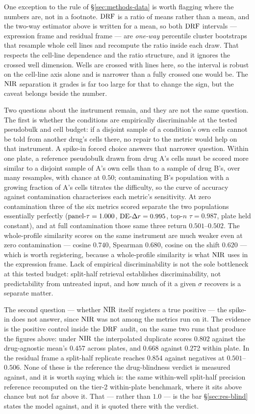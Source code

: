 One exception to the rule of \S\ref{sec:methods-data} is worth flagging where the numbers are, not
in a footnote. $\textrm{DRF}$ is a ratio of means rather than a mean, and the two-way estimator above is
written for a mean, so both $\textrm{DRF}$ intervals --- expression frame and residual frame --- are
\emph{one-way} percentile cluster bootstraps that resample whole cell lines and recompute the ratio
inside each draw. That respects the cell-line dependence and the ratio structure, and it ignores the
crossed well dimension. Wells are crossed with lines here, so the interval is robust on the
cell-line axis alone and is narrower than a fully crossed one would be. The $\textrm{NIR}$ separation it
grades is far too large for that to change the sign, but the caveat belongs beside the number.

Two questions about the instrument remain, and they are not the same question. The first is whether
the conditions are empirically discriminable at the tested pseudobulk and cell budget: if a
disjoint sample of a condition's own cells cannot be told from another drug's cells there, no repair
to the metric would help on that instrument. A spike-in forced choice answers that narrower
question. Within one plate, a reference pseudobulk drawn from drug A's
cells must be scored more similar to a disjoint sample of A's own cells than to a sample of drug
B's, over many resamples, with chance at $0.50$; contaminating B's population with a growing
fraction of A's cells titrates the difficulty, so the curve of accuracy against contamination
characterises each metric's sensitivity. At zero contamination three of the six metrics scored
separate the two populations essentially perfectly ($\textrm{panel-}\tau = 1.000$, $\textrm{DE-}\Delta r = 0.995$, top-$n$
$\tau = 0.987$, plate held constant), and at full contamination those same three return
$0.501$--$0.502$. The whole-profile similarity scores on the same instrument are much weaker even at zero contamination
--- cosine $0.740$, Spearman $0.680$, cosine on the shift $0.620$ --- which is worth registering,
because a whole-profile similarity is what $\textrm{NIR}$ uses in the expression frame. Lack of empirical
discriminability is not the sole bottleneck at this tested budget: split-half
retrieval establishes discriminability, not predictability from untreated input, and how much of it
a given $\sigma$ recovers is a separate matter.

The second question --- whether $\textrm{NIR}$ itself registers a true positive --- the spike-in does not
answer, since $\textrm{NIR}$ was not among the metrics run on it. The evidence is the positive control
inside the $\textrm{DRF}$ audit, on the same two runs that produce the figures above: under $\textrm{NIR}$ the
interpolated duplicate scores $0.802$ against the drug-agnostic mean's $0.457$ across plates, and
$0.668$ against $0.272$ within plate. In the residual frame a split-half replicate reaches $0.854$
against negatives at $0.501$--$0.506$. None of these is the reference the drug-blindness verdict is
measured against, and it is worth saying which is: the same within-well split-half precision
reference recomputed on the tier-2 within-plate benchmark, where it sits above chance but not far
above it. That --- rather than $1.0$ --- is the bar \S\ref{sec:res-blind} states the model against,
and it is quoted there with the verdict.


